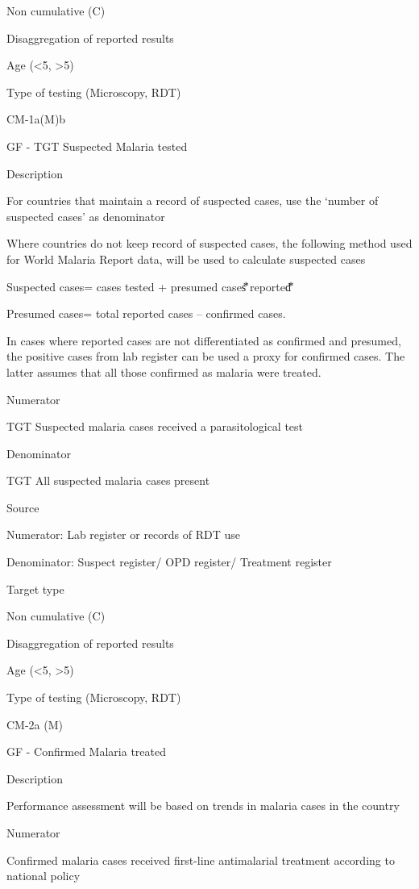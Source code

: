\documentclass[]{book}
\begin{document}
Non cumulative (C)

Disaggregation of reported results

Age (\textless{}5, \textgreater{}5)

Type of testing (Microscopy, RDT)

CM-1a(M)b

GF - TGT Suspected Malaria tested

Description

For countries that maintain a record of suspected cases, use the `number of suspected cases' as denominator

Where countries do not keep record of suspected cases, the following method used for World Malaria Report data, will be used to calculate suspected cases

Suspected cases= cases tested + presumed cases⃰ reported⃰

Presumed cases= total reported cases -- confirmed cases.

In cases where reported cases are not differentiated as confirmed and presumed, the positive cases from lab register can be used a proxy for confirmed cases.
The latter assumes that all those confirmed as malaria were treated.

Numerator

TGT Suspected malaria cases received a parasitological test

Denominator

TGT All suspected malaria cases present

Source

Numerator: Lab register or records of RDT use

Denominator: Suspect register/ OPD register/ Treatment register

Target type

Non cumulative (C)

Disaggregation of reported results

Age (\textless{}5, \textgreater{}5)

Type of testing (Microscopy, RDT)

CM-2a (M)

GF - Confirmed Malaria treated

Description

Performance assessment will be based on trends in malaria cases in the country

Numerator

Confirmed malaria cases received first-line antimalarial treatment according to national policy
\end{document}
